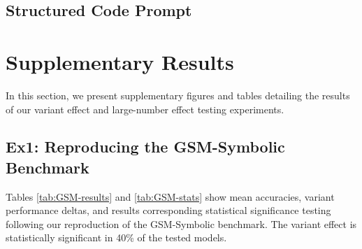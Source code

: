 \documentclass[11pt]{article}
\begin{document}
\subsection*{Structured Code Prompt}



\newpage
\section{Supplementary Results} \label{apx:full-results}
In this section, we present supplementary figures and tables detailing the results of our variant effect and large-number effect testing experiments. 

\subsection{Ex1: Reproducing the GSM-Symbolic Benchmark}
Tables \ref{tab:GSM-results} and \ref{tab:GSM-stats} show mean accuracies, variant performance deltas, and results corresponding statistical significance testing following our reproduction of the GSM-Symbolic benchmark. The variant effect is statistically significant in 40\% of the tested models. 
\end{document}
